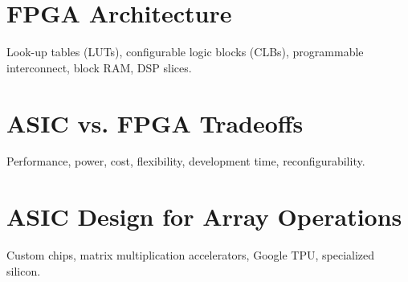 \chapter{FPGA Architecture}
Look-up tables (LUTs), configurable logic blocks (CLBs), programmable interconnect, block RAM, DSP slices.

\chapter{ASIC vs. FPGA Tradeoffs}
Performance, power, cost, flexibility, development time, reconfigurability.

\chapter{ASIC Design for Array Operations}
Custom chips, matrix multiplication accelerators, Google TPU, specialized silicon.